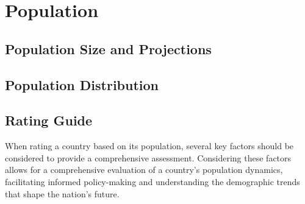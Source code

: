 \section{Population}

\subsection{Population Size and Projections}

\subsection{Population Distribution}

\subsection{Rating Guide}
When rating a country based on its population, several key
factors should be considered to provide a comprehensive
assessment. Considering these factors allows for a comprehensive
evaluation of a country's population dynamics, facilitating
informed policy-making and understanding the demographic
trends that shape the nation's future.
